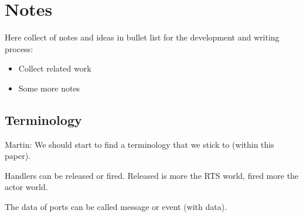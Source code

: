 \documentclass[a4paper, conference]{IEEEtran}
\newcommand{\martin}[1]{{\color{blue} Martin: #1}}
\begin{document}



\section{Notes}

Here collect of notes and ideas in bullet list for the development and writing process:

\begin{itemize}
\item Collect related work
\item Some more notes
\end{itemize}

\subsection{Terminology}

\martin{We should start to find a terminology that we stick to (within this paper).}

Handlers can be released or fired. Released is more the RTS world, fired more the
actor world.

The data of ports can be called message or event (with data).
\end{document}
